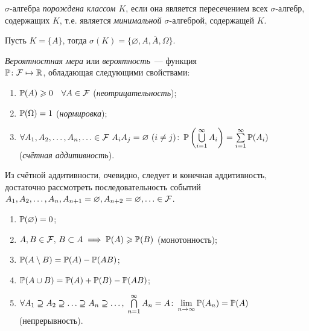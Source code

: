 \hypertarget{generated_sigma}{}
\begin{defn}
	$\sigma \text{-алгебра}$ \textit{порождена классом $K$}, если она является пересечением всех $\sigma \text{-алгебр}$, содержащих $K$, т.е. является \textit{минимальной $\sigma \text{-алгеброй}$}, содержащей $K$.
\end{defn}

\begin{exmp}
	Пусть $K = \{A\}$, тогда $\sigma (K) = \{\varnothing, A, \overline{A}, \Omega\}$.
\end{exmp}

\begin{defn}
	\textit{Вероятностная мера} или \textit{вероятность}~--- функция \\
	${\operatorname{\mathbb{P}}\colon \mathcal{F} \mapsto \mathbb{R}}$, обладающая следующими свойствами:
	
	\begin{enumerate}
		\item 
		      $\operatorname{\mathbb{P}}(A) \geqslant 0 \quad \forall A \in \mathcal{F}$ (\textit{неотрицательность});
		\item 
		      $\operatorname{\mathbb{P}}(\Omega) = 1$ (\textit{нормировка});
		\item 
		      $\forall A_1, A_2, \ldots, A_n, \ldots \in \mathcal{F}~ A_{i}A_{j} = \varnothing~ (i \ne j) \colon \operatorname{\mathbb{P}}\left( \bigcup\limits_{i=1}^\infty A_i \right) = \sum\limits_{i=1}^\infty \operatorname{\mathbb{P}}(A_i)$ \\
		      (\textit{счётная аддитивность}).
	\end{enumerate}
\end{defn}

\begin{rmrk}
	Из счётной аддитивности, очевидно, следует и конечная аддитивность, достаточно рассмотреть последовательность событий $A_1, A_2, \ldots, A_n, A_{n+1}=\varnothing, A_{n+2}=\varnothing,\ldots \in \mathcal{F}$.
\end{rmrk}
\begin{namedthm}\leavevmode
	\begin{enumerate}
		\item 
		      $\operatorname{\mathbb{P}}(\varnothing)=0$;
		\item 
		      $A, B \in \mathcal{F}, \, B \subset A \implies \operatorname{\mathbb{P}}(A) \geqslant \operatorname{\mathbb{P}}(B)$ (монотонность);
		\item 
		      $\operatorname{\mathbb{P}}(A \setminus B) = \operatorname{\mathbb{P}}(A) - \operatorname{\mathbb{P}}(AB)$;
		\item 
		      $\operatorname{\mathbb{P}}(A \cup B) = \operatorname{\mathbb{P}}(A) + \operatorname{\mathbb{P}}(B) - \operatorname{\mathbb{P}}(AB)$;
		\item 
		      $\forall A_1 \supseteq A_2 \supseteq \ldots \supseteq A_n \supseteq \ldots, \; \bigcap\limits_{n = 1}^{\infty} A_n = A \colon \lim\limits_{n \to \infty}\operatorname{\mathbb{P}}(A_n) = \operatorname{\mathbb{P}}(A)$ \\
		      (непрерывность).
	\end{enumerate}
\end{namedthm}

